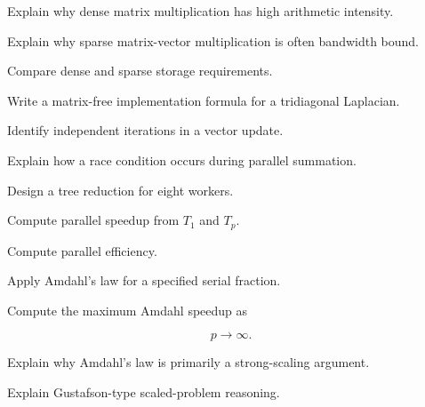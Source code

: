 \begin{exercise}[3]
Explain why dense matrix multiplication has high arithmetic intensity.
\end{exercise}

\begin{exercise}[3]
Explain why sparse matrix-vector multiplication is often bandwidth bound.
\end{exercise}

\begin{exercise}[3]
Compare dense and sparse storage requirements.
\end{exercise}

\begin{exercise}[3]
Write a matrix-free implementation formula for a tridiagonal Laplacian.
\end{exercise}

\begin{exercise}[2]
Identify independent iterations in a vector update.
\end{exercise}

\begin{exercise}[3]
Explain how a race condition occurs during parallel summation.
\end{exercise}

\begin{exercise}[3]
Design a tree reduction for eight workers.
\end{exercise}

\begin{exercise}[2]
Compute parallel speedup from \(T_1\) and \(T_p\).
\end{exercise}

\begin{exercise}[2]
Compute parallel efficiency.
\end{exercise}

\begin{exercise}[3]
Apply Amdahl's law for a specified serial fraction.
\end{exercise}

\begin{exercise}[3]
Compute the maximum Amdahl speedup as

\[
p\to\infty.
\]
\end{exercise}

\begin{exercise}[3]
Explain why Amdahl's law is primarily a strong-scaling argument.
\end{exercise}

\begin{exercise}[3]
Explain Gustafson-type scaled-problem reasoning.
\end{exercise}


